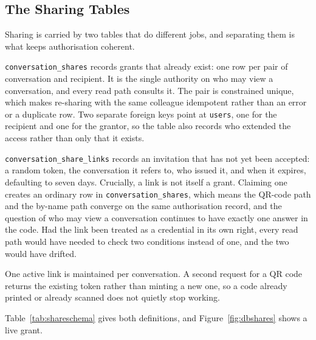 \subsection{The Sharing Tables}

Sharing is carried by two tables that do different jobs, and separating them is what keeps
authorisation coherent.

\texttt{conversation\_shares} records grants that already exist: one row per pair of
conversation and recipient. It is the single authority on who may view a conversation,
and every read path consults it. The pair is constrained unique, which makes re-sharing with
the same colleague idempotent rather than an error or a duplicate row. Two separate foreign
keys point at \texttt{users}, one for the recipient and one for the grantor, so the table
also records who extended the access rather than only that it exists.

\texttt{conversation\_share\_links} records an invitation that has not yet been accepted: a
random token, the conversation it refers to, who issued it, and when it expires, defaulting
to seven days. Crucially, a link is not itself a grant. Claiming one creates an ordinary
row in \texttt{conversation\_shares}, which means the QR-code path and the by-name path
converge on the same authorisation record, and the question of who may view a conversation
continues to have exactly one answer in the code. Had the link been treated as a credential
in its own right, every read path would have needed to check two conditions instead of one,
and the two would have drifted.

One active link is maintained per conversation. A second request for a QR code returns the
existing token rather than minting a new one, so a code already printed or already scanned
does not quietly stop working.

Table~\ref{tab:shareschema} gives both definitions, and Figure~\ref{fig:dbshares} shows a
live grant.

